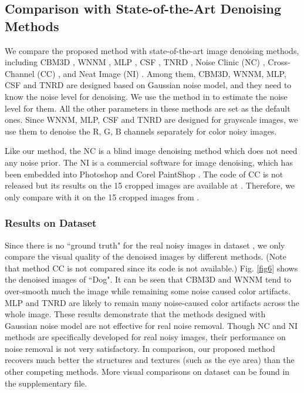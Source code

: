\documentclass[10pt,twocolumn,letterpaper]{article}
\begin{document}
\vspace{-1mm}
\subsection{Comparison with State-of-the-Art Denoising Methods}

We compare the proposed method with state-of-the-art image denoising methods, including CBM3D \cite{bm3d,cbm3d}, WNNM \cite{wnnm}, MLP \cite{mlp}, CSF \cite{csf}, TNRD \cite{chen2015learning}, Noise Clinic (NC) \cite{noiseclinic}, Cross-Channel (CC) \cite{crosschannel2016}, and Neat Image (NI) \cite{neatimage}. Among them, CBM3D, WNNM, MLP, CSF and TNRD are designed based on Gaussian noise model, and they need to know the noise level for denoising. We use the method in \cite{noiselevel} to estimate the noise level for them. All the other parameters in these methods are set as the default ones. Since WNNM, MLP, CSF and TNRD are designed for grayscale images, we use them to denoise the R, G, B channels separately for color noisy images. 

Like our method, the NC is a blind image denoising method which does not need any noise prior. The NI is a commercial software for image denoising, which has been embedded into Photoshop and Corel PaintShop \cite{neatimage}. The code of CC is not released but its results on the 15 cropped images are available at \cite{crosschannel2016}. Therefore, we only compare with it on the 15 cropped images from \cite{crosschannel2016}. 

\vspace{-1mm}
\subsubsection{Results on Dataset \cite{ncwebsite}}

Since there is no ``ground truth" for the real noisy images in  dataset \cite{ncwebsite}, we only compare the visual quality of the denoised images by different methods. (Note that method CC \cite{crosschannel2016} is not compared since its code is not available.) Fig. \ref{fig6} shows the denoised images of ``Dog". It can be seen that CBM3D and WNNM tend to over-smooth much the image while remaining some noise caused color artifacts. MLP and TNRD are likely to remain many noise-caused color artifacts across the whole image. These results demonstrate that the methods designed with Gaussian noise model are not effective for real noise removal. Though NC and NI methods are specifically developed for real noisy images, their performance on noise removal is not very satisfactory. In comparison, our proposed method recovers much better the structures and textures (such as the eye area) than the other competing methods. More visual comparisons on dataset \cite{ncwebsite} can be found in the supplementary file.
\end{document}
